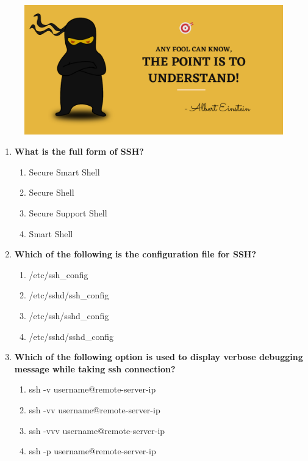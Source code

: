 \setlength{\columnsep}{3pt}
\begin{flushleft}
	
	\paragraph{}
	\bigskip
	
	\begin{figure}[h!]
		\centering
		\includegraphics[scale=.2]{content/practise.jpg}
	\end{figure}	
	\begin{enumerate}
		
		\item \textbf{What is the full form of SSH?}
		\begin{enumerate}[label=(\alph*)]
			\item Secure Smart Shell
			\item Secure Shell     %
			\item Secure Support Shell
			\item Smart Shell
		\end{enumerate}
		\bigskip
		\bigskip	

		\item \textbf{Which of the following is the configuration file for SSH?}
		\begin{enumerate}[label=(\alph*)]
			\item /etc/ssh\_config
			\item /etc/sshd/ssh\_config
			\item /etc/ssh/sshd\_config %
			\item /etc/sshd/sshd\_config
		\end{enumerate}
		\bigskip
		\bigskip	
		
		\item \textbf{Which of the following option is used to display verbose debugging message while taking ssh connection?}	
		\begin{enumerate}[label=(\alph*)]
			\item ssh -v username@remote-server-ip   %
			\item ssh -vv username@remote-server-ip  %
			\item ssh -vvv username@remote-server-ip %
			\item ssh -p username@remote-server-ip
		\end{enumerate}
		\bigskip
		\bigskip	
		

\end{enumerate}
\end{flushleft}
